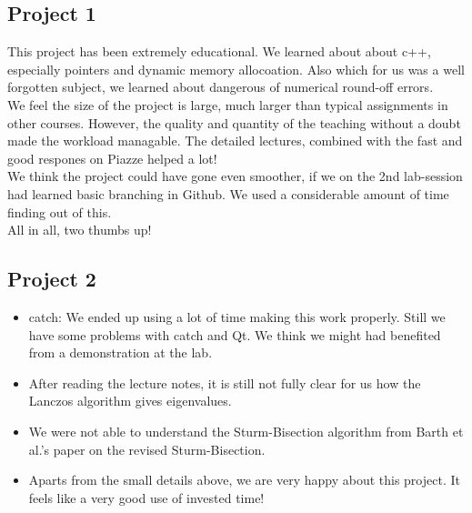 \documentclass{article}
\begin{document}
\subsection{Project 1}
This project has been extremely educational. We learned about about c++, especially pointers and dynamic memory allocoation. Also which for us was a well forgotten subject, we learned about dangerous of numerical round-off errors. \\

We feel the size of the project is large, much larger than typical assignments in other courses. However, the quality and quantity of the teaching without a doubt made the workload managable. The detailed lectures, combined with the fast and good respones on Piazze helped a lot!\\

We think the project could have gone even smoother, if we on the 2nd lab-session had learned basic branching in Github. We used a considerable amount of time finding out of this.\\

All in all, two thumbs up!

\subsection{Project 2}
\begin{itemize}
	\item  catch: We ended up using a lot of time making this work properly. Still we have some problems with catch and Qt. We think we might had benefited from a demonstration at the lab.
	
	\item After reading the lecture notes, it is still not fully clear for us how the Lanczos algorithm gives eigenvalues. 
	
	\item We were not able to understand the Sturm-Bisection algorithm from Barth et al.'s \cite{barth} paper on the revised Sturm-Bisection. 
	
	\item Aparts from the small details above, we are very happy about this project. It feels like a very good use of invested time!
\end{itemize}
\end{document}
